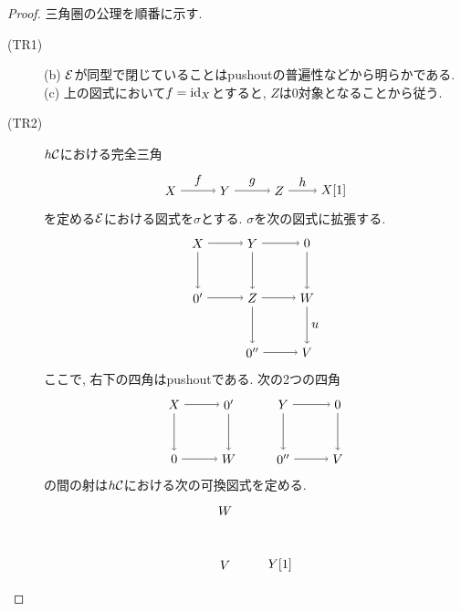 \documentclass[uplatex, a4paper, 14Q, dvipdfmx]{jsarticle}
\begin{document}
\begin{proof}
  三角圏の公理を順番に示す.
  \begin{description}
    \item[(TR1)] (b) $\mathcal{E}$が同型で閉じていることはpushoutの普遍性などから明らかである.
    (c) 上の図式において$f = \mathrm{id}_X$とすると, $Z$は$0$対象となることから従う.  
    \item[(TR2)] $h\mathcal{C}$における完全三角
    \[
      \begin{tikzpicture}[auto,->]
        \node (X) at (0,0) {$X$};
        \node (Y) at (1.5,0) {$Y$};
        \node (Z) at (3,0) {$Z$};
        \node (X[1]) at (4.5,0) {$X[1]$};
        \draw (X) -- node {$f$} (Y);
        \draw (Y) -- node {$g$} (Z);
        \draw (Z) -- node {$h$} (X[1]);
      \end{tikzpicture}
    \]
    を定める$\mathcal{E}$における図式を$\sigma$とする.
    $\sigma$を次の図式に拡張する.
    \[
      \begin{tikzpicture}[auto,->]
        \node (0') at (0,0) {$0'$};
        \node (Z) at (1.5,0) {$Z$};
        \node (W) at (3,0) {$W$};
        \node (X) at (0,1.5) {$X$};
        \node (Y) at (1.5,1.5) {$Y$};
        \node (0) at (3,1.5) {$0$};
        \node (0'') at (1.5,-1.5) {$0''$};
        \node (V) at (3,-1.5) {$V$};
        \draw (X) -- (Y);
        \draw (Y) -- (Z);
        \draw (Z) -- (W);
        \draw (Y) -- (0);
        \draw (X) -- (0');
        \draw (0') -- (Z);
        \draw (0) -- (W);
        \draw (Z) -- (0'');
        \draw (0'') -- (V);
        \draw (W) -- node {$u$} (V);
      \end{tikzpicture}
    \]
    ここで, 右下の四角はpushoutである.
    次の2つの四角
    \[
      \begin{tikzpicture}[auto,->]
        \node (0') at (0,0) {$0$};
        \node (W) at (1.5,0) {$W$};
        \node (X) at (0,1.5) {$X$};
        \node (0) at (1.5,1.5) {$0'$};
        \node (0'') at (3,0) {$0''$};
        \node (V) at (4.5,0) {$V$};
        \node (Y) at (3,1.5) {$Y$};
        \node (0again) at (4.5,1.5) {$0$};
        \draw (X) -- (0);
        \draw (X) -- (0');
        \draw (0) -- (W);
        \draw (0') -- (W);
        \draw (Y) -- (0again);
        \draw (Y) -- (0'');
        \draw (0again) -- (V);
        \draw (0'') -- (V);
      \end{tikzpicture}
    \]
    の間の射は$h\mathcal{C}$における次の可換図式を定める. 
    \[
      \begin{tikzpicture}[auto,->]
        \node (V) at (0,0) {$V$};
        \node (Y[1]) at (1.5,0) {$Y[1]$};
        \node (W) at (0,1.5) {$W$};

\end{tikzpicture}\]
\end{description}
\end{proof}
\end{document}
